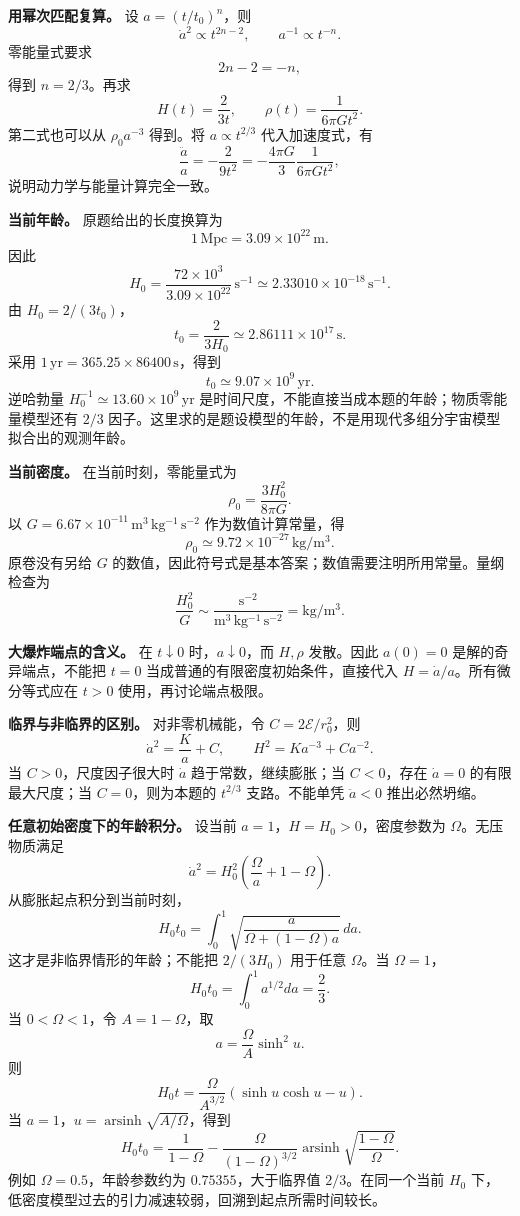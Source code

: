 \documentclass[12pt,a4paper,UTF8]{ctexart}
\begin{document}
\textbf{用幂次匹配复算。} 设 \(a=(t/t_0)^n\)，则 \[
\dot a^2\propto t^{2n-2},
\qquad a^{-1}\propto t^{-n}.
\] 零能量式要求 \[
2n-2=-n,
\] 得到 \(n=2/3\)。再求 \[
\boxed{H(t)=\frac{2}{3t}},
\qquad
\boxed{\rho(t)=\frac{1}{6\pi Gt^2}}.
\] 第二式也可以从 \(\rho_0a^{-3}\) 得到。将 \(a\propto t^{2/3}\)
代入加速度式，有 \[
\frac{\ddot a}{a}=-\frac{2}{9t^2}
=-\frac{4\pi G}{3}\frac{1}{6\pi Gt^2},
\] 说明动力学与能量计算完全一致。

\textbf{当前年龄。} 原题给出的长度换算为 \[
1\,\mathrm{Mpc}=3.09\times10^{22}\,\mathrm m.
\] 因此 \[
H_0=\frac{72\times10^3}{3.09\times10^{22}}\,\mathrm{s^{-1}}
\simeq2.33010\times10^{-18}\,\mathrm{s^{-1}}.
\] 由 \(H_0=2/(3t_0)\)， \[
\boxed{t_0=\frac{2}{3H_0}\simeq2.86111\times10^{17}\,\mathrm s}.
\] 采用 \(1\,\mathrm{yr}=365.25\times86400\,\mathrm s\)，得到 \[
\boxed{t_0\simeq9.07\times10^9\,\mathrm{yr}}.
\] 逆哈勃量 \(H_0^{-1}\simeq13.60\times10^9\,\mathrm{yr}\)
是时间尺度，不能直接当成本题的年龄；物质零能量模型还有 \(2/3\)
因子。这里求的是题设模型的年龄，不是用现代多组分宇宙模型拟合出的观测年龄。

\textbf{当前密度。} 在当前时刻，零能量式为 \[
\boxed{\rho_0=\frac{3H_0^2}{8\pi G}}.
\] 以 \(G=6.67\times10^{-11}\,\mathrm{m^3\,kg^{-1}\,s^{-2}}\)
作为数值计算常量，得 \[
\boxed{\rho_0\simeq9.72\times10^{-27}\,\mathrm{kg/m^3}}.
\] 原卷没有另给 \(G\)
的数值，因此符号式是基本答案；数值需要注明所用常量。量纲检查为 \[
\frac{H_0^2}{G}
\sim\frac{\mathrm{s^{-2}}}{\mathrm{m^3\,kg^{-1}\,s^{-2}}}
=\mathrm{kg/m^3}.
\]

\textbf{大爆炸端点的含义。} 在 \(t\downarrow0\) 时，\(a\downarrow0\)，而
\(H,\rho\) 发散。因此 \(a(0)=0\) 是解的奇异端点，不能把 \(t=0\)
当成普通的有限密度初始条件，直接代入 \(H=\dot a/a\)。所有微分等式应在
\(t>0\) 使用，再讨论端点极限。

\textbf{临界与非临界的区别。} 对非零机械能，令
\(C=2\mathcal E/r_0^2\)，则 \[
\dot a^2=\frac{K}{a}+C,
\qquad
H^2=Ka^{-3}+Ca^{-2}.
\] 当 \(C>0\)，尺度因子很大时 \(\dot a\) 趋于常数，继续膨胀；当
\(C<0\)，存在 \(\dot a=0\) 的有限最大尺度；当 \(C=0\)，则为本题的
\(t^{2/3}\) 支路。不能单凭 \(\ddot a<0\) 推出必然坍缩。

\textbf{任意初始密度下的年龄积分。} 设当前
\(a=1\)，\(H=H_0>0\)，密度参数为 \(\Omega\)。无压物质满足 \[
\dot a^2=H_0^2\left(\frac{\Omega}{a}+1-\Omega\right).
\] 从膨胀起点积分到当前时刻， \[
H_0t_0=
\int_0^1\sqrt{\frac{a}{\Omega+(1-\Omega)a}}\,da.
\] 这才是非临界情形的年龄；不能把 \(2/(3H_0)\) 用于任意 \(\Omega\)。当
\(\Omega=1\)， \[
H_0t_0=\int_0^1a^{1/2}da=\frac23.
\] 当 \(0<\Omega<1\)，令 \(A=1-\Omega\)，取 \[
a=\frac{\Omega}{A}\sinh^2 u.
\] 则 \[
H_0t=
\frac{\Omega}{A^{3/2}}
\left(\sinh u\cosh u-u\right).
\] 当 \(a=1\)，\(u=\operatorname{arsinh}\sqrt{A/\Omega}\)，得到 \[
\boxed{H_0t_0=
\frac1{1-\Omega}
-\frac{\Omega}{(1-\Omega)^{3/2}}
\operatorname{arsinh}\sqrt{\frac{1-\Omega}{\Omega}}}.
\] 例如 \(\Omega=0.5\)，年龄参数约为 \(0.75355\)，大于临界值
\(2/3\)。在同一个当前 \(H_0\)
下，低密度模型过去的引力减速较弱，回溯到起点所需时间较长。
\end{document}
